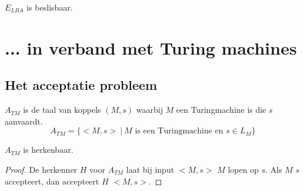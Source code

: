 \documentclass[main.tex]{subfiles}
\begin{document}
\begin{gev}
  $E_{LBA}$ is beslisbaar.
\end{gev}



\section{...  in verband met Turing machines}
\label{sec:verb-met-tms}

\subsection{Het acceptatie probleem}
\label{sec:het-acceptatie-probleem}

\begin{de}
  \label{de:a-tm}
  $A_{TM}$ is de taal van koppels $(M,s)$ waarbij $M$ een Turingmachine is die $s$ aanvaardt.
  \[ A_{TM} = \{ <M,s> \ |\ M \text{ is een Turingmachine en } s \in L_{M} \} \]
\end{de}

\begin{st}
  \label{st:a-tm-herk}
  $A_{TM}$ is herkenbaar.
  \begin{proof}
    De herkenner $H$ voor $A_{TM}$ laat bij input $<M,s>$ $M$ lopen op $s$.
    Als $M$ $s$ accepteert, dan accepteert $H$ $<M,s>$.
  \end{proof}
\end{st}
\end{document}
